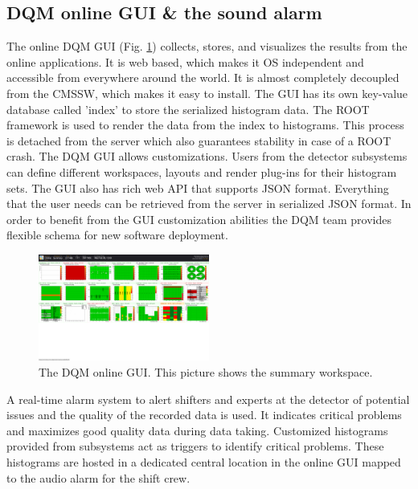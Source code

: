 \documentclass[journal]{IEEEtran}
\begin{document}
\subsection{DQM online GUI \& the sound alarm}
The online DQM GUI (Fig. \ref{OnlineGUI}) collects, stores, and visualizes the results from the online applications. It is web based, which makes it OS independent and accessible from everywhere around the world. It is almost completely decoupled from the CMSSW, which makes it easy to install. The GUI has its own key-value database called ’index’ to store the serialized histogram data. The ROOT framework is used to render the data from the index to histograms. This process is detached from the server which also guarantees stability in case of a ROOT crash. The DQM GUI allows customizations. Users from the detector subsystems can define different workspaces, layouts and render plug-ins for their histogram sets. The GUI also has rich web API that supports JSON format. Everything that the user needs can be retrieved from the server in serialized JSON format. In order to benefit from the GUI customization abilities the DQM team provides flexible schema for new software deployment.

\begin{figure}
\includegraphics[width=0.5\textwidth, keepaspectratio=true]{OnlineGUI.png}
\caption{The DQM online GUI. This picture shows the summary workspace.}
\label{OnlineGUI}
\end{figure}

A real-time alarm system to alert shifters and experts at the detector of potential issues and the quality of the recorded data is used. It indicates critical problems and maximizes good quality data during data taking. Customized histograms provided from subsystems act as triggers to identify critical problems. These histograms are hosted in a dedicated central location in the online GUI mapped to the audio alarm for the shift crew.
\end{document}
